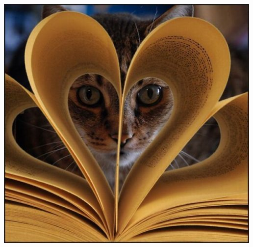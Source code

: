 \documentclass[notes=hide]{beamer}
\begin{document}
\begin{frame}[t,plain]
\begin{center}
  \vspace{\fill}
  \includegraphics[width=\textwidth]{img/cat-love.jpg}
  \vspace{\fill}
\end{center}
\end{frame}
\end{document}
